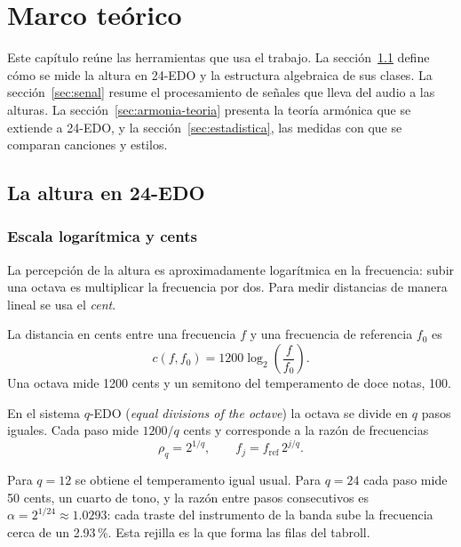 \chapter{Marco teórico}\label{cap:marco}

Este capítulo reúne las herramientas que usa el trabajo. La sección~\ref{sec:altura} define cómo se mide la altura en
24-EDO y la estructura algebraica de sus clases. La sección~\ref{sec:senal} resume el procesamiento de señales que lleva
del audio a las alturas. La sección~\ref{sec:armonia-teoria} presenta la teoría armónica que se extiende a 24-EDO, y la
sección~\ref{sec:estadistica}, las medidas con que se comparan canciones y estilos.

\section{La altura en 24-EDO}\label{sec:altura}

\subsection{Escala logarítmica y cents}

La percepción de la altura es aproximadamente logarítmica en la frecuencia: subir una octava es multiplicar la frecuencia
por dos. Para medir distancias de manera lineal se usa el \emph{cent}.

\begin{definicion}[Cents]
La distancia en cents entre una frecuencia $f$ y una frecuencia de referencia $f_0$ es
\[
  c(f, f_0) = 1200 \log_2\!\left(\frac{f}{f_0}\right).
\]
Una octava mide 1200 cents y un semitono del temperamento de doce notas, 100.
\end{definicion}

\begin{definicion}[$q$-EDO]
En el sistema $q$-EDO (\emph{equal divisions of the octave}) la octava se divide en $q$ pasos iguales. Cada paso mide
$1200/q$ cents y corresponde a la razón de frecuencias
\[
  \rho_q = 2^{1/q}, \qquad f_j = f_{\mathrm{ref}}\, 2^{j/q}.
\]
\end{definicion}

Para $q = 12$ se obtiene el temperamento igual usual. Para $q = 24$ cada paso mide 50 cents, un cuarto de tono, y la razón
entre pasos consecutivos es $\alpha = 2^{1/24} \approx 1.0293$: cada traste del instrumento de la banda sube la frecuencia
cerca de un 2.93\,\%. Esta rejilla es la que forma las filas del tabroll.

